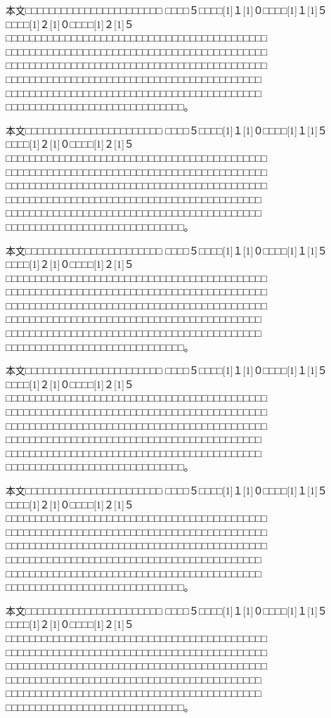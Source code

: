 \documentclass[fleqn]{ieej-report2}%
\begin{document}
{本文□□□□□□□□□□□□□□□□□□□□□□□
□□□□５□□□□\scalebox{0.5}[1]{１}\scalebox{0.5}[1]{０}□□□□\scalebox{0.5}[1]{１}\scalebox{0.5}[1]{５}□□□□\scalebox{0.5}[1]{２}\scalebox{0.5}[1]{０}□□□□\scalebox{0.5}[1]{２}\scalebox{0.5}[1]{５}□□□□□□□□□□□□□□□□□□□□□□□□□□□□□□□□□□□□□□□□□□□□
□□□□□□□□□□□□□□□□□□□□□□□□□□□□□□□□□□□□□□□□□□□□
□□□□□□□□□□□□□□□□□□□□□□□□□□□□□□□□□□□□□□□□□□□□
□□□□□□□□□□□□□□□□□□□□□□□□□□□□□□□□□□□□□□□□□□□
□□□□□□□□□□□□□□□□□□□□□□□□□□□□□□□□□□□□□□□□□□□
□□□□□□□□□□□□□□□□□□□□□□□□□□□□□□。

本文□□□□□□□□□□□□□□□□□□□□□□□
□□□□５□□□□\scalebox{0.5}[1]{１}\scalebox{0.5}[1]{０}□□□□\scalebox{0.5}[1]{１}\scalebox{0.5}[1]{５}□□□□\scalebox{0.5}[1]{２}\scalebox{0.5}[1]{０}□□□□\scalebox{0.5}[1]{２}\scalebox{0.5}[1]{５}□□□□□□□□□□□□□□□□□□□□□□□□□□□□□□□□□□□□□□□□□□□□
□□□□□□□□□□□□□□□□□□□□□□□□□□□□□□□□□□□□□□□□□□□□
□□□□□□□□□□□□□□□□□□□□□□□□□□□□□□□□□□□□□□□□□□□□
□□□□□□□□□□□□□□□□□□□□□□□□□□□□□□□□□□□□□□□□□□□
□□□□□□□□□□□□□□□□□□□□□□□□□□□□□□□□□□□□□□□□□□□
□□□□□□□□□□□□□□□□□□□□□□□□□□□□□□。

本文□□□□□□□□□□□□□□□□□□□□□□□
□□□□５□□□□\scalebox{0.5}[1]{１}\scalebox{0.5}[1]{０}□□□□\scalebox{0.5}[1]{１}\scalebox{0.5}[1]{５}□□□□\scalebox{0.5}[1]{２}\scalebox{0.5}[1]{０}□□□□\scalebox{0.5}[1]{２}\scalebox{0.5}[1]{５}□□□□□□□□□□□□□□□□□□□□□□□□□□□□□□□□□□□□□□□□□□□□
□□□□□□□□□□□□□□□□□□□□□□□□□□□□□□□□□□□□□□□□□□□□
□□□□□□□□□□□□□□□□□□□□□□□□□□□□□□□□□□□□□□□□□□□□
□□□□□□□□□□□□□□□□□□□□□□□□□□□□□□□□□□□□□□□□□□□
□□□□□□□□□□□□□□□□□□□□□□□□□□□□□□□□□□□□□□□□□□□
□□□□□□□□□□□□□□□□□□□□□□□□□□□□□□。

本文□□□□□□□□□□□□□□□□□□□□□□□
□□□□５□□□□\scalebox{0.5}[1]{１}\scalebox{0.5}[1]{０}□□□□\scalebox{0.5}[1]{１}\scalebox{0.5}[1]{５}□□□□\scalebox{0.5}[1]{２}\scalebox{0.5}[1]{０}□□□□\scalebox{0.5}[1]{２}\scalebox{0.5}[1]{５}□□□□□□□□□□□□□□□□□□□□□□□□□□□□□□□□□□□□□□□□□□□□
□□□□□□□□□□□□□□□□□□□□□□□□□□□□□□□□□□□□□□□□□□□□
□□□□□□□□□□□□□□□□□□□□□□□□□□□□□□□□□□□□□□□□□□□□
□□□□□□□□□□□□□□□□□□□□□□□□□□□□□□□□□□□□□□□□□□□
□□□□□□□□□□□□□□□□□□□□□□□□□□□□□□□□□□□□□□□□□□□
□□□□□□□□□□□□□□□□□□□□□□□□□□□□□□。

本文□□□□□□□□□□□□□□□□□□□□□□□
□□□□５□□□□\scalebox{0.5}[1]{１}\scalebox{0.5}[1]{０}□□□□\scalebox{0.5}[1]{１}\scalebox{0.5}[1]{５}□□□□\scalebox{0.5}[1]{２}\scalebox{0.5}[1]{０}□□□□\scalebox{0.5}[1]{２}\scalebox{0.5}[1]{５}□□□□□□□□□□□□□□□□□□□□□□□□□□□□□□□□□□□□□□□□□□□□
□□□□□□□□□□□□□□□□□□□□□□□□□□□□□□□□□□□□□□□□□□□□
□□□□□□□□□□□□□□□□□□□□□□□□□□□□□□□□□□□□□□□□□□□□
□□□□□□□□□□□□□□□□□□□□□□□□□□□□□□□□□□□□□□□□□□□
□□□□□□□□□□□□□□□□□□□□□□□□□□□□□□□□□□□□□□□□□□□
□□□□□□□□□□□□□□□□□□□□□□□□□□□□□□。

本文□□□□□□□□□□□□□□□□□□□□□□□
□□□□５□□□□\scalebox{0.5}[1]{１}\scalebox{0.5}[1]{０}□□□□\scalebox{0.5}[1]{１}\scalebox{0.5}[1]{５}□□□□\scalebox{0.5}[1]{２}\scalebox{0.5}[1]{０}□□□□\scalebox{0.5}[1]{２}\scalebox{0.5}[1]{５}□□□□□□□□□□□□□□□□□□□□□□□□□□□□□□□□□□□□□□□□□□□□
□□□□□□□□□□□□□□□□□□□□□□□□□□□□□□□□□□□□□□□□□□□□
□□□□□□□□□□□□□□□□□□□□□□□□□□□□□□□□□□□□□□□□□□□□
□□□□□□□□□□□□□□□□□□□□□□□□□□□□□□□□□□□□□□□□□□□
□□□□□□□□□□□□□□□□□□□□□□□□□□□□□□□□□□□□□□□□□□□
□□□□□□□□□□□□□□□□□□□□□□□□□□□□□□。

}
\end{document}
